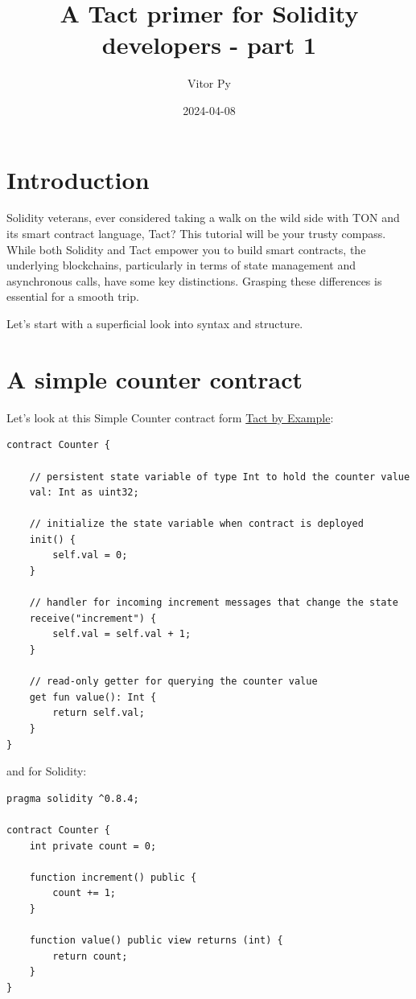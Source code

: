 \documentclass{article}
\title{A Tact primer for Solidity developers - part 1}
\author{Vitor Py}
\date{2024-04-08}
\begin{document}

\maketitle

\section{Introduction}

Solidity veterans, ever considered taking a walk on the wild side with TON and its smart contract language, Tact? This tutorial will be your trusty compass. While both Solidity and Tact empower you to build smart contracts, the underlying blockchains, particularly in terms of state management and asynchronous calls, have some key distinctions. Grasping these differences is essential for a smooth trip.

Let's start with a superficial look into syntax and structure.

\section{A simple counter contract}

Let's look at this Simple Counter contract form \href{https://tact-by-example.org/01-a-simple-counter}{Tact by Example}:

\begin{verbatim}
contract Counter {

    // persistent state variable of type Int to hold the counter value
    val: Int as uint32;

    // initialize the state variable when contract is deployed
    init() {
        self.val = 0;
    }

    // handler for incoming increment messages that change the state
    receive("increment") {
        self.val = self.val + 1;
    }

    // read-only getter for querying the counter value
    get fun value(): Int {
        return self.val;
    }
}
\end{verbatim}

and for Solidity:

\begin{verbatim}
pragma solidity ^0.8.4;

contract Counter {
    int private count = 0;

    function increment() public {
        count += 1;
    }

    function value() public view returns (int) {
        return count;
    }
}
\end{verbatim}
\end{document}
